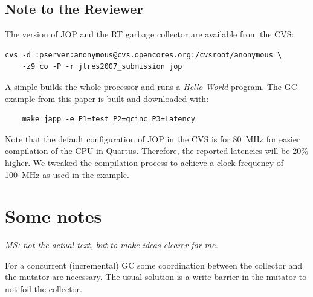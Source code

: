 
%


\subsection*{Note to the Reviewer}

The version of JOP and the RT garbage collector are available from
the CVS: {\small
\begin{verbatim}
cvs -d :pserver:anonymous@cvs.opencores.org:/cvsroot/anonymous \
    -z9 co -P -r jtres2007_submission jop
\end{verbatim}
} A simple  builds the whole processor and runs a
\emph{Hello World} program. The GC example from this paper is built
and downloaded with: {\small
\begin{verbatim}
    make japp -e P1=test P2=gcinc P3=Latency
\end{verbatim}
}

Note that the default configuration of JOP in the CVS is for 80~MHz
for easier compilation of the CPU in Quartus. Therefore, the
reported latencies will be 20\% higher. We tweaked the compilation
process to achieve a clock frequency of 100~MHz as used in the
example.

\section{Some notes}

\emph{MS: not the actual text, but to make ideas clearer for me.}

For a concurrent (incremental) GC some coordination between the
collector and the mutator are necessary. The usual solution is a
write barrier in the mutator to not foil the collector.

